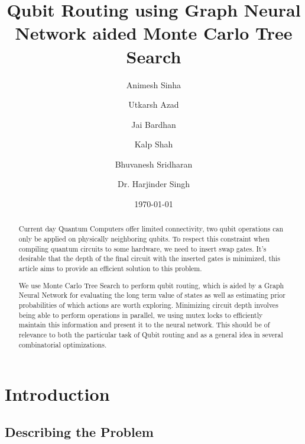 \documentclass[%
 reprint,
 amsmath,amssymb,
 aps,
]{revtex4-2}
\begin{document}

\title{Qubit Routing using Graph Neural Network aided Monte Carlo Tree Search}

\author{Animesh Sinha}
\author{Utkarsh Azad}
\author{Jai Bardhan}
\author{Kalp Shah}
\author{Bhuvanesh Sridharan}
\author{Dr. Harjinder Singh}
%

\date{\today}%

\begin{abstract}
    Current day Quantum Computers offer limited connectivity, two qubit operations can only be applied on physically neighboring qubits. To respect this constraint when compiling quantum circuits to some hardware, we need to insert swap gates. It's desirable that the depth of the final circuit with the inserted gates is minimized, this article aims to provide an efficient solution to this problem.

    We use Monte Carlo Tree Search to perform qubit routing, which is aided by a Graph Neural Network for evaluating the long term value of states as well as estimating prior probabilities of which actions are worth exploring. Minimizing circuit depth involves being able to perform operations in parallel, we using mutex locks to efficiently maintain this information and present it to the neural network. This should be of relevance to both the particular task of Qubit routing and as a general idea in several combinatorial optimizations.
\end{abstract}

\maketitle


\section{\label{sec:intro}Introduction}

\subsection{\label{sec:intro-defn}Describing the Problem}
\end{document}

